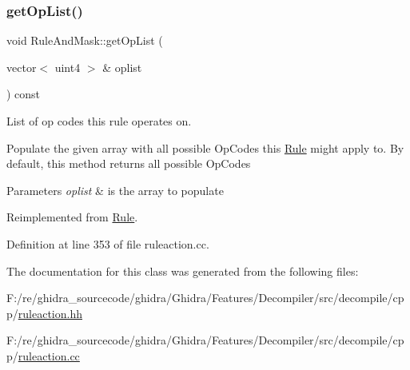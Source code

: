 \subsubsection{\texorpdfstring{getOpList()}{getOpList()}}
{\footnotesize\ttfamily void Rule\+And\+Mask\+::get\+Op\+List (\begin{DoxyParamCaption}\item[{vector$<$ uint4 $>$ \&}]{oplist }\end{DoxyParamCaption}) const\hspace{0.3cm}{\ttfamily [virtual]}}



List of op codes this rule operates on. 

Populate the given array with all possible Op\+Codes this \mbox{\hyperlink{class_rule}{Rule}} might apply to. By default, this method returns all possible Op\+Codes 
\begin{DoxyParams}{Parameters}
{\em oplist} & is the array to populate \\
\hline
\end{DoxyParams}


Reimplemented from \mbox{\hyperlink{class_rule_a4023bfc7825de0ab866790551856d10e}{Rule}}.



Definition at line 353 of file ruleaction.\+cc.



The documentation for this class was generated from the following files\+:\begin{DoxyCompactItemize}
\item 
F\+:/re/ghidra\+\_\+sourcecode/ghidra/\+Ghidra/\+Features/\+Decompiler/src/decompile/cpp/\mbox{\hyperlink{ruleaction_8hh}{ruleaction.\+hh}}\item 
F\+:/re/ghidra\+\_\+sourcecode/ghidra/\+Ghidra/\+Features/\+Decompiler/src/decompile/cpp/\mbox{\hyperlink{ruleaction_8cc}{ruleaction.\+cc}}\end{DoxyCompactItemize}
